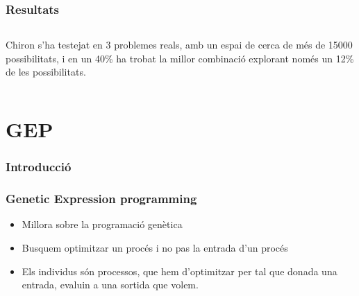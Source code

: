 \documentclass{beamer}
\begin{document}
\begin{frame}
	\frametitle{Resultats}
	\begin{columns}[c]
		Chiron s'ha testejat en 3 problemes reals, amb un espai de cerca de més de 15000
		possibilitats, i en un 40\% ha trobat la millor combinació explorant només un
		12\% de les possibilitats.
	\end{columns}
\end{frame}

\section{GEP} %
\label{sec:GEP}

\begin{frame}
	\frametitle{Introducció}

\end{frame}

\begin{frame}
	\frametitle{Genetic Expression programming}
	\begin{itemize}
		\item Millora sobre la programació genètica
		\item Busquem optimitzar un procés i no pas la entrada d'un procés
		\item Els individus són processos, que hem d'optimitzar per tal que donada una entrada,
			evaluin a una sortida que volem.
	\end{itemize}
\end{frame}
\end{document}
